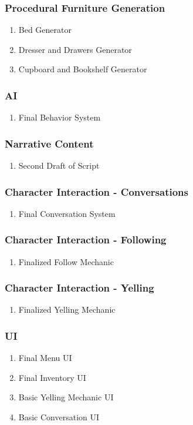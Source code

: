 \subsubsection{Procedural Furniture Generation}
\begin{enumerate}
\item Bed Generator
\item Dresser and Drawers Generator
\item Cupboard and Bookshelf Generator 
\end{enumerate}
\subsubsection{AI}
\begin{enumerate}
\item Final Behavior System
\end{enumerate}
\subsubsection{Narrative Content}
\begin{enumerate}
\item Second Draft of Script
\end{enumerate}
\subsubsection{Character Interaction - Conversations}
\begin{enumerate}
\item Final Conversation System
\end{enumerate}
\subsubsection{Character Interaction - Following}
\begin{enumerate}
\item Finalized Follow Mechanic
\end{enumerate}
\subsubsection{Character Interaction - Yelling}
\begin{enumerate}
\item Finalized Yelling Mechanic
\end{enumerate}
\subsubsection{UI}
\begin{enumerate}
\item Final Menu UI
\item Final Inventory UI
\item Basic Yelling Mechanic UI
\item Basic Conversation UI
\end{enumerate}
